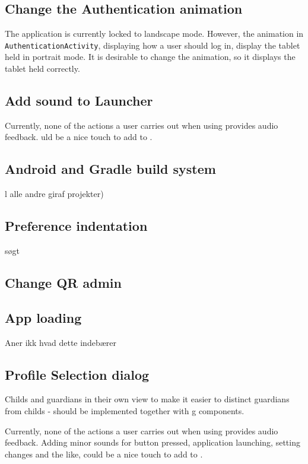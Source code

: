 \subsection{Change the Authentication animation}
The application is currently locked to landscape mode.
However, the animation in \lstinline!AuthenticationActivity!, displaying how a user should log in, display the tablet held in portrait mode.
It is desirable to change the animation, so it displays the tablet held correctly.

\subsection{Add sound to Launcher}
Currently, none of the actions a user carries out when using \launcher provides audio feedback.
uld be a nice touch to add to \launcher. 

\subsection{Android and Gradle build system}
l alle andre giraf projekter)

\subsection{Preference indentation}
søgt

\subsection{Change QR admin}

\subsection{App loading}

Aner ikk hvad dette indebærer

\subsection{Profile Selection dialog}
Childs and guardians in their own view to make it easier to distinct guardians from childs - should be implemented together with g components.

Currently, none of the actions a user carries out when using \launcher provides audio feedback.
Adding minor sounds for button pressed, application launching, setting changes and the like, could be a nice touch to add to \launcher. 

